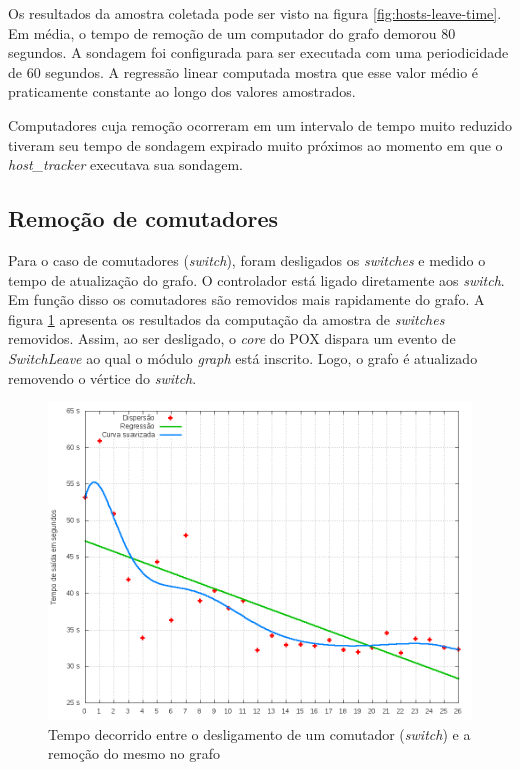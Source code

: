 Os resultados da amostra coletada pode ser visto na figura
\ref{fig:hosts-leave-time}.
Em média, o tempo de remoção de um computador do grafo demorou 80 segundos.
A sondagem foi configurada para ser executada com uma periodicidade de 60 
segundos. 
A regressão linear computada mostra que esse valor médio é praticamente 
constante ao longo dos valores amostrados.

Computadores cuja remoção ocorreram em um intervalo de tempo muito reduzido
tiveram seu tempo de sondagem expirado muito próximos ao momento em que 
o \emph{host\_tracker} executava sua sondagem. 

\subsection{Remoção de comutadores}

Para o caso de comutadores (\emph{switch}), foram desligados os 
\emph{switches} e medido o tempo de atualização do grafo.
O controlador está ligado diretamente aos \emph{switch}. 
Em função disso os comutadores são removidos mais rapidamente do grafo.
A figura \ref{fig:switch-leave-time} apresenta os resultados da 
computação da amostra de \emph{switches} removidos.
Assim, ao ser desligado, o \emph{core} do POX dispara um evento 
de \emph{SwitchLeave} ao qual o módulo \emph{graph} está inscrito. 
Logo, o grafo é atualizado removendo o vértice do \emph{switch}.

\begin{figure}[h!]
    \centering
    \label{fig:switch-leave-time}
    \includegraphics[width=\linewidth]{img/switch-leave-time}
    \caption{Tempo decorrido entre o desligamento de um comutador 
    (\emph{switch}) e a remoção do mesmo no grafo}
\end{figure}

